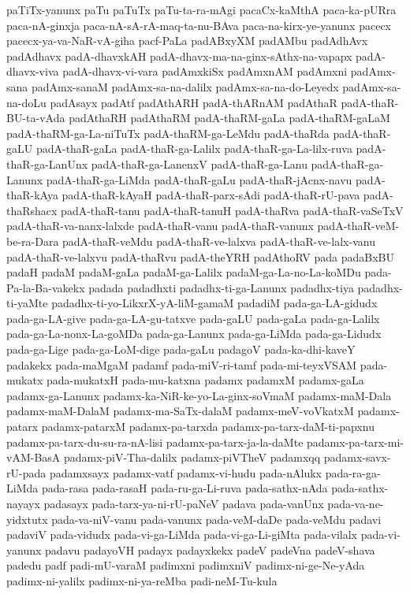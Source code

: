 {paTiTx-yanunx
paTu
paTuTx
paTu-ta-ra-mAgi
pacaCx-kaMthA
paca-ka-pURra
paca-nA-ginxja
paca-nA-sA-rA-maq-ta-nu-BAva
paca-na-kirx-ye-yanunx
pacecx
pacecx-ya-va-NaR-vA-giha
pacf-PaLa
padABxyXM
padAMbu
padAdhAvx
padAdhavx
padA-dhavxkAH
padA-dhavx-ma-na-ginx-sAthx-na-vapapx
padA-dhavx-viva
padA-dhavx-vi-vara
padAmxkiSx
padAmxnAM
padAmxni
padAmx-sana
padAmx-sanaM
padAmx-sa-na-dalilx
padAmx-sa-na-do-Leyedx
padAmx-sa-na-doLu
padAsayx
padAtf
padAthARH
padA-thARnAM
padAthaR
padA-thaR-BU-ta-vAda
padAthaRH
padAthaRM
padA-thaRM-gaLa
padA-thaRM-gaLaM
padA-thaRM-ga-La-niTuTx
padA-thaRM-ga-LeMdu
padA-thaRda
padA-thaR-gaLU
padA-thaR-gaLa
padA-thaR-ga-Lalilx
padA-thaR-ga-La-lilx-ruva
padA-thaR-ga-LanUnx
padA-thaR-ga-LanenxV
padA-thaR-ga-Lanu
padA-thaR-ga-Lanunx
padA-thaR-ga-LiMda
padA-thaR-gaLu
padA-thaR-jAcnx-navu
padA-thaR-kAya
padA-thaR-kAyaH
padA-thaR-parx-sAdi
padA-thaR-rU-pava
padA-thaRshacx
padA-thaR-tanu
padA-thaR-tanuH
padA-thaRva
padA-thaR-vaSeTxV
padA-thaR-va-nanx-lalxde
padA-thaR-vanu
padA-thaR-vanunx
padA-thaR-veM-be-ra-Dara
padA-thaR-veMdu
padA-thaR-ve-lalxva
padA-thaR-ve-lalx-vanu
padA-thaR-ve-lalxvu
padA-thaRvu
padA-theYRH
padAthoRV
pada
padaBxBU
padaH
padaM
padaM-gaLa
padaM-ga-Lalilx
padaM-ga-La-no-La-koMDu
pada-Pa-la-Ba-vakekx
padada
padadhxti
padadhx-ti-ga-Lanunx
padadhx-tiya
padadhx-ti-yaMte
padadhx-ti-yo-LikxrX-yA-liM-gamaM
padadiM
pada-ga-LA-gidudx
pada-ga-LA-give
pada-ga-LA-gu-tatxve
pada-gaLU
pada-gaLa
pada-ga-Lalilx
pada-ga-La-nonx-La-goMDa
pada-ga-Lanunx
pada-ga-LiMda
pada-ga-Lidudx
pada-ga-Lige
pada-ga-LoM-dige
pada-gaLu
padagoV
pada-ka-dhi-kaveY
padakekx
pada-maMgaM
padamf
pada-miV-ri-tamf
pada-mi-teyxVSAM
pada-mukatx
pada-mukatxH
pada-mu-katxna
padamx
padamxM
padamx-gaLa
padamx-ga-Lanunx
padamx-ka-NiR-ke-yo-La-ginx-soVmaM
padamx-maM-Dala
padamx-maM-DalaM
padamx-ma-SaTx-dalaM
padamx-meV-voVkatxM
padamx-patarx
padamx-patarxM
padamx-pa-tarxda
padamx-pa-tarx-daM-ti-papxnu
padamx-pa-tarx-du-su-ra-nA-lisi
padamx-pa-tarx-ja-la-daMte
padamx-pa-tarx-mi-vAM-BasA
padamx-piV-Tha-dalilx
padamx-piVTheV
padamxqq
padamx-savx-rU-pada
padamxsayx
padamx-vatf
padamx-vi-hudu
pada-nAlukx
pada-ra-ga-LiMda
pada-rasa
pada-rasaH
pada-ru-ga-Li-ruva
pada-sathx-nAda
pada-sathx-nayayx
padasayx
pada-tarx-ya-ni-rU-paNeV
padava
pada-vanUnx
pada-va-ne-yidxtutx
pada-va-niV-vanu
pada-vanunx
pada-veM-daDe
pada-veMdu
padavi
padaviV
pada-vidudx
pada-vi-ga-LiMda
pada-vi-ga-Li-giMta
pada-vilalx
pada-vi-yanunx
padavu
padayoVH
padayx
padayxkekx
padeV
padeVna
padeV-shava
padedu
padf
padi-mU-varaM
padimxni
padimxniV
padimx-ni-ge-Ne-yAda
padimx-ni-yalilx
padimx-ni-ya-reMba
padi-neM-Tu-kula
}
